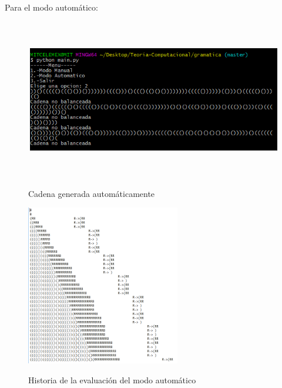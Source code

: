 Para el modo autom\'atico:\\
\begin{figure}[H]
\includegraphics[width=\textwidth, height=7cm]{ModoAutomaticoPare.png}
\label{fig:auto_alfabeto}
\caption{Cadena generada autom\'aticamente}
\end{figure}

\begin{figure}[H]
\includegraphics[width=\textwidth, height=7cm]{ArchivoHistoriaPare.png}
\label{fig:autotexto_alfabeto}
\caption{Historia de la evaluaci\'on del modo autom\'atico}
\end{figure}

\newpage
